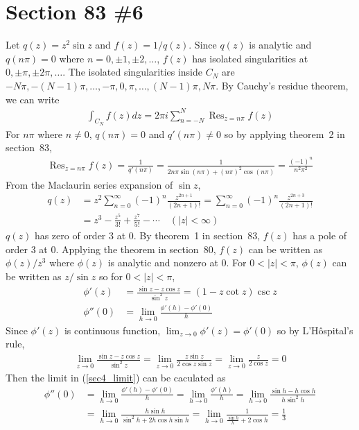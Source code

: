 \documentclass{scrartcl}
\DeclareMathOperator*{\Res}{Res}
\begin{document}
\section{Section 83 \#6}
Let \(q(z) = z^2 \sin z\) and \(f(z) = 1 / q(z)\).
Since \(q(z)\) is analytic and \(q(n\pi) = 0\) where \(n = 0, \pm 1, \pm 2, \dots\), \(f(z)\) has isolated singularities at \(0, \pm \pi, \pm 2\pi, \dots\).
The isolated singularities inside \(C_N\) are \(-N\pi, -(N - 1)\pi, \dots, -\pi, 0, \pi, \dots, (N - 1)\pi, N\pi\).
By Cauchy's residue theorem, we can write
\begin{align}\label{sec4_residue_sum}
  \int_{C_N} f(z) dz
  = 2\pi i \sum^N_{n = -N} \Res_{z = n\pi} f(z)
\end{align}
For \(n\pi\) where \(n \not = 0\), \(q(n\pi) = 0\) and \(q'(n\pi) \not = 0\) so by applying theorem~2 in section~83,
\begin{align*}
  \Res_{z = n\pi} f(z) = \frac{1}{q'(n\pi)} = \frac{1}{2n\pi \sin (n\pi) + (n\pi)^2 \cos (n\pi)} = \frac{(-1)^n}{n^2 \pi^2}
\end{align*}
From the Maclaurin series expansion of \(\sin z\),
\begin{align*}
  q(z)
  &= z^2 \sum^\infty_{n = 0} (-1)^n \frac{z^{2n + 1}}{(2n + 1)!}
  = \sum^\infty_{n = 0} (-1)^n \frac{z^{2n + 3}}{(2n + 1)!} \\
  &= z^3 - \frac{z^5}{3!} + \frac{z^7}{5!} - \cdots \quad (|z| < \infty)
\end{align*}
\(q(z)\) has zero of order 3 at 0.
By theorem~1 in section~83, \(f(z)\) has a pole of order 3 at 0.
Applying the theorem in section~80, \(f(z)\) can be written as \(\phi(z) / z^3\) where \(\phi(z)\) is analytic and nonzero at 0.
For \(0 < |z| < \pi\), \(\phi(z)\) can be written as \(z / \sin z\) so for \(0 < |z| < \pi\),
\begin{align}
  \nonumber\phi'(z) &= \frac{\sin z - z\cos z}{\sin^2 z} = (1 - z\cot z) \csc z \\
  \label{sec4_limit}\phi''(0) &= \lim_{h \to 0} \frac{\phi'(h) - \phi'(0)}{h}
\end{align}
Since \(\phi'(z)\) is continuous function, \(\lim_{z \to 0} \phi'(z) = \phi'(0)\) so by L'Hôspital's rule,
\begin{align*}
  \lim_{z \to 0} \frac{\sin z - z \cos z}{\sin^2 z}
  = \lim_{z \to 0} \frac{z\sin z}{2\cos z\sin z}
  = \lim_{z \to 0} \frac{z}{2\cos z}
  = 0
\end{align*}
Then the limit in (\ref{sec4_limit}) can be caculated as
\begin{align*}
  \phi''(0)
  &= \lim_{h \to 0} \frac{\phi'(h) - \phi'(0)}{h}
  = \lim_{h \to 0} \frac{\phi'(h)}{h}
  = \lim_{h \to 0} \frac{\sin h - h\cos h}{h\sin^2 h} \\
  &= \lim_{h \to 0} \frac{h \sin h}{\sin^2 h + 2h\cos h\sin h}
  = \lim_{h \to 0} \frac{1}{\frac{\sin h}{h} + 2\cos h}
  = \frac{1}{3}
\end{align*}
\end{document}
